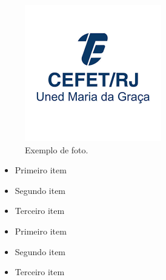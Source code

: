
\label{sec:introducao}

\begin{figure}[H]
\centering
\includegraphics[width=0.5\linewidth]{imagens/cefet.png}
\caption{Exemplo de foto.}
\label{fig:cefet}
\end{figure}

\begin{itemize}
    \item Primeiro item
    \item Segundo item
    \item Terceiro item
\end{itemize}

\begin{itemize}
    \item Primeiro item
    \item Segundo item
    \item Terceiro item
\end{itemize}



\citep{8890660} %
\cite{8890660} %
